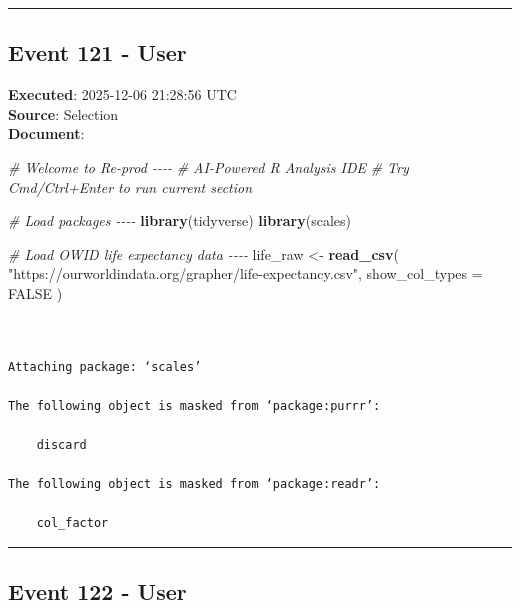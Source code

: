 \documentclass[
  11pt,
]{article}
\newenvironment{Shaded}{\begin{snugshade}}{\end{snugshade}}
\newcommand{\AttributeTok}[1]{\textcolor[rgb]{0.13,0.29,0.53}{#1}}
\newcommand{\CommentTok}[1]{\textcolor[rgb]{0.56,0.35,0.01}{\textit{#1}}}
\newcommand{\ConstantTok}[1]{\textcolor[rgb]{0.56,0.35,0.01}{#1}}
\newcommand{\FunctionTok}[1]{\textcolor[rgb]{0.13,0.29,0.53}{\textbf{#1}}}
\newcommand{\NormalTok}[1]{#1}
\newcommand{\OtherTok}[1]{\textcolor[rgb]{0.56,0.35,0.01}{#1}}
\newcommand{\StringTok}[1]{\textcolor[rgb]{0.31,0.60,0.02}{#1}}
\newenvironment{rpoutput}{\vspace{0.5em}\begin{snugshade}}{\end{snugshade}}
\begin{document}
\begin{center}\rule{0.5\linewidth}{0.5pt}\end{center}

\subsection{Event 121 - User}\label{event-121---user}

\textbf{Executed}: 2025-12-06 21:28:56 UTC\\
\textbf{Source}: Selection\\
\textbf{Document}:

\begin{Shaded}
\begin{Highlighting}[]
\CommentTok{\# Welcome to Re{-}prod {-}{-}{-}{-}}
\CommentTok{\# AI{-}Powered R Analysis IDE}
\CommentTok{\# Try Cmd/Ctrl+Enter to run current section}

\CommentTok{\# Load packages {-}{-}{-}{-}}
\FunctionTok{library}\NormalTok{(tidyverse)}
\FunctionTok{library}\NormalTok{(scales)}

\CommentTok{\# Load OWID life expectancy data {-}{-}{-}{-}}
\NormalTok{life\_raw }\OtherTok{\textless{}{-}} \FunctionTok{read\_csv}\NormalTok{(}
  \StringTok{"https://ourworldindata.org/grapher/life{-}expectancy.csv"}\NormalTok{,}
  \AttributeTok{show\_col\_types =} \ConstantTok{FALSE}
\NormalTok{)}
\end{Highlighting}
\end{Shaded}

\begin{rpoutput}

\begin{verbatim}


Attaching package: ‘scales’

The following object is masked from ‘package:purrr’:

    discard

The following object is masked from ‘package:readr’:

    col_factor
\end{verbatim}

\end{rpoutput}

\begin{center}\rule{0.5\linewidth}{0.5pt}\end{center}

\subsection{Event 122 - User}\label{event-122---user}
\end{document}
